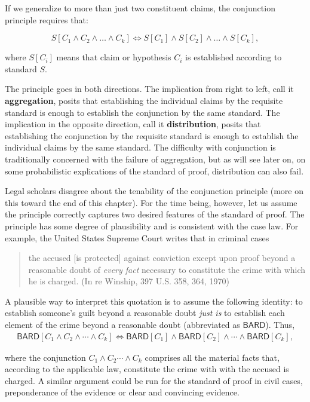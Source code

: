 \documentclass[
  10pt,
  dvipsnames,enabledeprecatedfontcommands]{scrartcl}
\newcommand{\et}{\wedge}
\begin{document}
\noindent If we generalize to more than just two constituent claims, the
conjunction principle requires that:

\[S[C_1 \wedge C_2  \wedge \dots \wedge  C_k] \Leftrightarrow S[C_1] \wedge S[C_2]  \wedge \dots \wedge  S[C_k],\]

\noindent where \(S[C_i]\) means that claim or hypothesis \(C_i\) is
established according to standard \(S\).

The principle goes in both directions. The implication from right to
left, call it \textbf{aggregation}, posits that establishing the
individual claims by the requisite standard is enough to establish the
conjunction by the same standard. The implication in the opposite
direction, call it \textbf{distribution}, posits that establishing the
conjunction by the requisite standard is enough to establish the
individual claims by the same standard. The difficulty with conjunction
is traditionally concerned with the failure of aggregation, but as will
see later on, on some probabilistic explications of the standard of
proof, distribution can also fail.

Legal scholars disagree about the tenability of the conjunction
principle (more on this toward the end of this chapter). For the time
being, however, let us assume the principle correctly captures two
desired features of the standard of proof. The principle has some degree
of plausibility and is consistent with the case law. For example, the
United States Supreme Court writes that in criminal cases

\begin{quote}
the accused [is protected] against conviction except upon proof beyond a reasonable doubt of \textit{every fact} necessary to constitute the crime with which he is charged. \linebreak 
(In re Winship, 397 U.S. 358, 364, 1970)
\end{quote}

\noindent A plausible way to interpret this quotation is to assume the
following identity: to establish someone's guilt beyond a reasonable
doubt \textit{just is} to establish each element of the crime beyond a
reasonable doubt (abbreviated as \(\mathsf{BARD}\)). Thus,
\begin{align*}\mathsf{BARD}[C_1 \wedge C_2   \wedge \cdots \wedge C_k] \Leftrightarrow \mathsf{BARD}[C_1] \wedge \mathsf{BARD}[C_2]  \wedge \cdots \wedge \mathsf{BARD}[C_k],
\end{align*}

\noindent where the conjunction \(C_1 \et C_2 \cdots \et C_k\) comprises
all the material facts that, according to the applicable law, constitute
the crime with with the accused is charged. A similar argument could be
run for the standard of proof in civil cases, preponderance of the
evidence or clear and convincing evidence.
\end{document}
